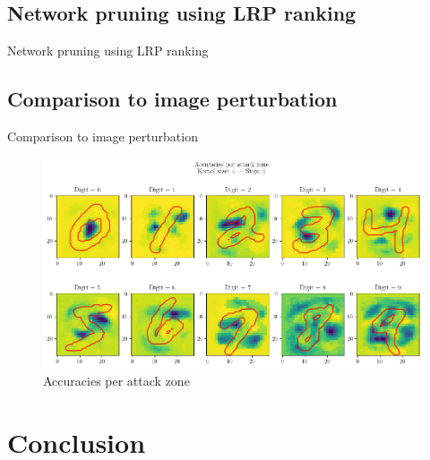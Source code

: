 \documentclass[aspectratio=169]{beamer}
\theoremstyle{definition}
\begin{document}
\subsection{Network pruning using LRP ranking}
\begin{frame}{Network pruning using LRP ranking}
    
\end{frame}

\subsection{Comparison to image perturbation}
\begin{frame}{Comparison to image perturbation}
    \begin{figure}
        \includegraphics[width=.7\textwidth]{attacks.png}
        \caption{Accuracies per attack zone}
    \end{figure}
\end{frame}

\section{Conclusion}
\begin{frame}
    \nocite{*}
    \printbibliography
\end{frame}
\end{document}
